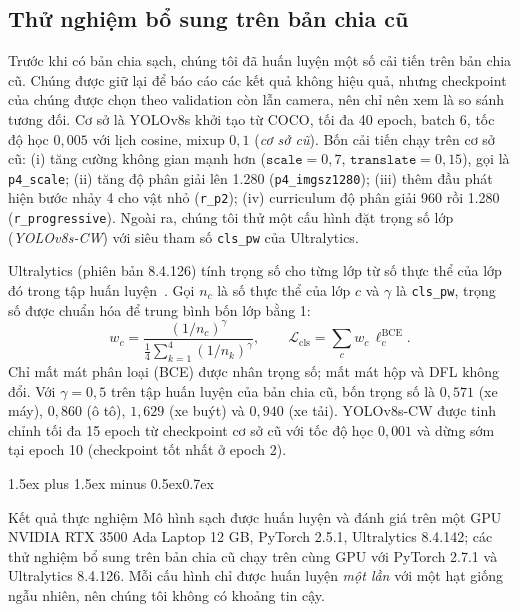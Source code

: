 \documentclass[10pt,journal,letterpaper]{IEEEtran}
\makeatletter
\renewcommand\section{\@startsection{section}{1}{\z@}%
  {1.5ex plus 1.5ex minus 0.5ex}{0.7ex}{\normalfont\scshape\raggedright}}
\makeatother
\begin{document}
\subsection{Thử nghiệm bổ sung trên bản chia cũ}
Trước khi có bản chia sạch, chúng tôi đã huấn luyện một số cải tiến trên bản chia cũ. Chúng được giữ lại để báo cáo các kết quả không hiệu quả, nhưng checkpoint của chúng được chọn theo validation còn lẫn camera, nên chỉ nên xem là so sánh tương đối. Cơ sở là YOLOv8s khởi tạo từ COCO, tối đa 40 epoch, batch 6, tốc độ học $0{,}005$ với lịch cosine, mixup $0{,}1$ (\emph{cơ sở cũ}). Bốn cải tiến chạy trên cơ sở cũ: (i) tăng cường không gian mạnh hơn ($\texttt{scale}=0{,}7$, $\texttt{translate}=0{,}15$), gọi là \texttt{p4\_scale}; (ii) tăng độ phân giải lên 1.280 (\texttt{p4\_imgsz1280}); (iii) thêm đầu phát hiện bước nhảy 4 cho vật nhỏ (\texttt{r\_p2}); (iv) curriculum độ phân giải 960 rồi 1.280 (\texttt{r\_progressive}). Ngoài ra, chúng tôi thử một cấu hình đặt trọng số lớp (\emph{YOLOv8s-CW}) với siêu tham số \texttt{cls\_pw} của Ultralytics.

Ultralytics (phiên bản 8.4.126) tính trọng số cho từng lớp từ số thực thể của lớp đó trong tập huấn luyện~\cite{ultraloss}. Gọi $n_c$ là số thực thể của lớp $c$ và $\gamma$ là \texttt{cls\_pw}, trọng số được chuẩn hóa để trung bình bốn lớp bằng 1:
\begin{equation}
w_c=\frac{(1/n_c)^{\gamma}}{\frac{1}{4}\sum_{k=1}^{4}(1/n_k)^{\gamma}},\qquad
\mathcal{L}_{\text{cls}}=\sum_{c} w_c\,\ell^{\text{BCE}}_c .
\end{equation}
Chỉ mất mát phân loại (BCE) được nhân trọng số; mất mát hộp và DFL không đổi. Với $\gamma=0{,}5$ trên tập huấn luyện của bản chia cũ, bốn trọng số là $0{,}571$ (xe máy), $0{,}860$ (ô tô), $1{,}629$ (xe buýt) và $0{,}940$ (xe tải). YOLOv8s-CW được tinh chỉnh tối đa 15 epoch từ checkpoint cơ sở cũ với tốc độ học $0{,}001$ và dừng sớm tại epoch 10 (checkpoint tốt nhất ở epoch 2).

\section{Kết quả thực nghiệm}
Mô hình sạch được huấn luyện và đánh giá trên một GPU NVIDIA RTX 3500 Ada Laptop 12 GB, PyTorch 2.5.1, Ultralytics 8.4.142; các thử nghiệm bổ sung trên bản chia cũ chạy trên cùng GPU với PyTorch 2.7.1 và Ultralytics 8.4.126. Mỗi cấu hình chỉ được huấn luyện \emph{một lần} với một hạt giống ngẫu nhiên, nên chúng tôi không có khoảng tin cậy.
\end{document}
